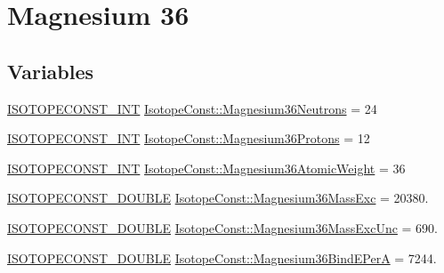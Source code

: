 \hypertarget{group___isotope_const-_magnesium-_mg36}{}\section{Magnesium 36}
\label{group___isotope_const-_magnesium-_mg36}
\subsection*{Variables}
\begin{DoxyCompactItemize}
\item 
\mbox{\hyperlink{group___isotope_const-_macros_ga5f18360b3e99483a35c32d789e62621c}{I\+S\+O\+T\+O\+P\+E\+C\+O\+N\+S\+T\+\_\+\+I\+NT}} \mbox{\hyperlink{group___isotope_const-_magnesium-_mg36_ga2f10069bf1936d0d323cd4be5c1cefe2}{Isotope\+Const\+::\+Magnesium36\+Neutrons}} = 24
\item 
\mbox{\hyperlink{group___isotope_const-_macros_ga5f18360b3e99483a35c32d789e62621c}{I\+S\+O\+T\+O\+P\+E\+C\+O\+N\+S\+T\+\_\+\+I\+NT}} \mbox{\hyperlink{group___isotope_const-_magnesium-_mg36_gaa62c469a2ce6a0c90e46942a521b91c2}{Isotope\+Const\+::\+Magnesium36\+Protons}} = 12
\item 
\mbox{\hyperlink{group___isotope_const-_macros_ga5f18360b3e99483a35c32d789e62621c}{I\+S\+O\+T\+O\+P\+E\+C\+O\+N\+S\+T\+\_\+\+I\+NT}} \mbox{\hyperlink{group___isotope_const-_magnesium-_mg36_ga4fe6133ea7cf20b57244734fefa2544a}{Isotope\+Const\+::\+Magnesium36\+Atomic\+Weight}} = 36
\item 
\mbox{\hyperlink{group___isotope_const-_macros_ga8f45a7272ce02c0b4c65c44636ed719a}{I\+S\+O\+T\+O\+P\+E\+C\+O\+N\+S\+T\+\_\+\+D\+O\+U\+B\+LE}} \mbox{\hyperlink{group___isotope_const-_magnesium-_mg36_gad162ae600b59fcf96bdad197e26ef8be}{Isotope\+Const\+::\+Magnesium36\+Mass\+Exc}} = 20380.
\item 
\mbox{\hyperlink{group___isotope_const-_macros_ga8f45a7272ce02c0b4c65c44636ed719a}{I\+S\+O\+T\+O\+P\+E\+C\+O\+N\+S\+T\+\_\+\+D\+O\+U\+B\+LE}} \mbox{\hyperlink{group___isotope_const-_magnesium-_mg36_gacb3f1f53c9be0431b60a2e8908f3a7bd}{Isotope\+Const\+::\+Magnesium36\+Mass\+Exc\+Unc}} = 690.
\item 
\mbox{\hyperlink{group___isotope_const-_macros_ga8f45a7272ce02c0b4c65c44636ed719a}{I\+S\+O\+T\+O\+P\+E\+C\+O\+N\+S\+T\+\_\+\+D\+O\+U\+B\+LE}} \mbox{\hyperlink{group___isotope_const-_magnesium-_mg36_ga79db19304f315d294db0143e8575d9b2}{Isotope\+Const\+::\+Magnesium36\+Bind\+E\+PerA}} = 7244.
\item 

\end{DoxyCompactItemize}
